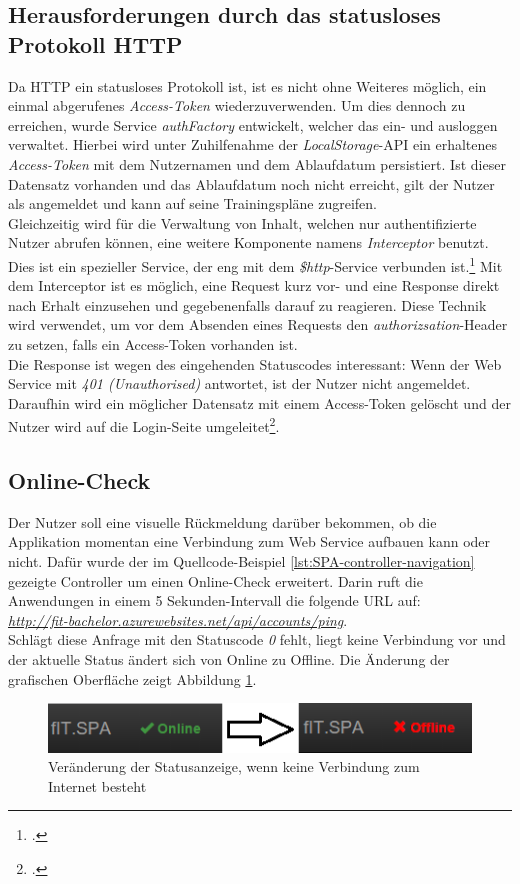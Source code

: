 \subsection{Herausforderungen durch das statusloses Protokoll HTTP}
\label{ssec:statusloses-http}
Da \ac{HTTP} ein statusloses Protokoll ist, ist es nicht ohne Weiteres möglich, ein einmal abgerufenes \textit{Access-Token} wiederzuverwenden. Um dies dennoch zu erreichen, wurde Service \textit{authFactory} entwickelt, welcher  das ein- und ausloggen verwaltet. Hierbei wird unter Zuhilfenahme der \textit{LocalStorage}-\ac{API} ein erhaltenes \textit{Access-Token} mit dem Nutzernamen und dem Ablaufdatum persistiert. Ist dieser Datensatz vorhanden und das Ablaufdatum noch nicht erreicht, gilt der Nutzer als angemeldet und kann auf seine Trainingspläne zugreifen. \\
Gleichzeitig wird für die Verwaltung von Inhalt, welchen nur authentifizierte Nutzer abrufen können, eine weitere Komponente namens \textit{Interceptor} benutzt. Dies ist ein spezieller Service, der eng mit dem \textit{\$http}-Service verbunden ist.\footcite{online:angular:interceptor} Mit dem Interceptor ist es möglich, eine Request kurz vor- und eine Response direkt nach Erhalt einzusehen und gegebenenfalls darauf zu reagieren. Diese Technik wird verwendet, um vor dem Absenden eines Requests den \textit{authorizsation}-Header zu setzen, falls ein Access-Token vorhanden ist. \\ 
Die Response ist wegen des eingehenden Statuscodes interessant: Wenn der Web Service mit \textit{401 (Unauthorised)} antwortet, ist der Nutzer nicht angemeldet. Daraufhin wird ein möglicher Datensatz mit einem Access-Token gelöscht und der Nutzer wird auf die Login-Seite umgeleitet\footcite{online:Created_SPA}. 

\subsection{Online-Check}
\label{ssec:Online-Check}
Der Nutzer soll eine visuelle Rückmeldung darüber bekommen, ob die Applikation momentan eine Verbindung zum Web Service aufbauen kann oder nicht. Dafür wurde der im Quellcode-Beispiel \ref{lst:SPA-controller-navigation} gezeigte Controller um einen Online-Check erweitert. Darin ruft die Anwendungen in einem 5 Sekunden-Intervall die folgende \ac{URL} auf: \\
\textit{\href{http://fit-bachelor.azurewebsites.net/api/accounts/ping}{http://fit-bachelor.azurewebsites.net/api/accounts/ping}}.\\ 
Schlägt diese Anfrage mit den Statuscode \textit{0} fehlt, liegt keine Verbindung vor und der aktuelle Status ändert sich von Online zu Offline. Die Änderung der grafischen Oberfläche zeigt Abbildung \ref{pic:SPA:OnlineCheck:Statusänderung}. 
\begin{figure}[h]
\centering
\includegraphics[width=0.8\linewidth]{content/images/SPA-Online-Check}
\caption{Veränderung der Statusanzeige, wenn keine Verbindung zum Internet besteht}
\label{pic:SPA:OnlineCheck:Statusänderung}
\end{figure}
